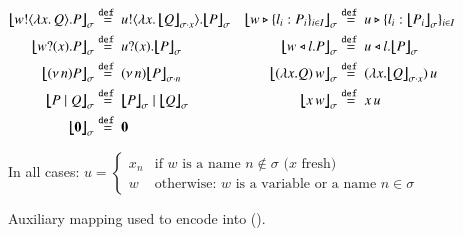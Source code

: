 \begin{figure}[t!]
	\begin{align*}
		\auxmapp{\bout{w}{\abs{x}{Q}} P}{{}}{\sigma} & \defeq \bout{u}{\abs{x}{\auxmapp{Q}{{}}{{\sigma \cat x}}}} \auxmapp{P}{{}}{\sigma}
		&
		\auxmapp{\bbra{w}{l_i:P_i}_{i \in I}}{{}}{\sigma} & \defeq \bbra{u}{l_i:\auxmapp{P_i}{{}}{\sigma}}_{i \in I}		
		\\
		\auxmapp{\binp{w}{x} P}{{}}{\sigma} & \defeq \binp{u}{x} \auxmapp{P}{{}}{\sigma} 
		&
		\auxmapp{\bsel{w}{l} P}{{}}{\sigma} & \defeq \bsel{u}{l} \auxmapp{P}{{}}{\sigma} 
		\\
		\auxmapp{\news{n} P}{{}}{\sigma} & \defeq \news{n} \auxmapp{P}{{}}{{\sigma \cat n}}
		&
		\auxmapp{\appl{(\lambda x.Q)}{w}}{{}}{\sigma}  & \defeq \appl{(\lambda x.\auxmapp{Q}{{}}{{\sigma \cat x}})}{u}
		\\
		\auxmapp{P \Par Q}{{}}{\sigma} & \defeq \auxmapp{P}{{}}{\sigma} \Par \auxmapp{Q}{{}}{\sigma} 
		&
		\auxmapp{\appl{x}{w}}{{}}{\sigma} & \defeq \appl{x}{u}
		\\
		\auxmapp{\inact}{{}}{\sigma}  & \defeq  \inact	
		& 
\end{align*}
\begin{center}
	{In all cases: $u = 
	\begin{cases} 
	x_n & \text{if $w$ is a name $n  \not\in \sigma$ ($x$ fresh)}
	\\
	w & \text{otherwise: $w$ is a variable or a name $n \in \sigma$} 
	 	\end{cases}$}
\end{center}
\caption{\label{f:auxmap} Auxiliary mapping used to encode \HOp into \HO ().}
\end{figure}
